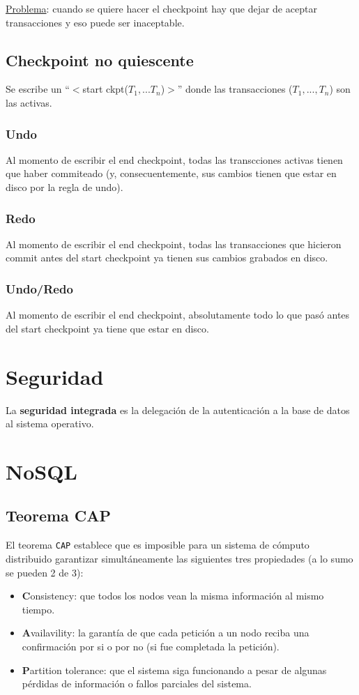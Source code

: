 \documentclass[]{article}
\begin{document}
\underline{Problema}: cuando se quiere hacer el checkpoint hay que dejar de aceptar transacciones y eso puede ser inaceptable.

\subsection{Checkpoint no quiescente}
Se escribe un ``$<$start ckpt($T_1, ... T_n$)$>$'' donde las transacciones ($T_1, ..., T_n$) son las activas.

\subsubsection{Undo}
Al momento de escribir el end checkpoint, todas las transcciones activas tienen que haber commiteado (y, consecuentemente, sus cambios tienen que estar en disco por la regla de undo).
\subsubsection{Redo}
Al momento de escribir el end checkpoint, todas las transacciones que hicieron commit antes del start checkpoint ya tienen sus cambios grabados en disco.
\subsubsection{Undo/Redo}
Al momento de escribir el end checkpoint, absolutamente todo lo que pasó antes del start checkpoint ya tiene que estar en disco.




\section{Seguridad}
La \textbf{seguridad integrada} es la delegación de la autenticación a la base de datos al sistema operativo.


\section{NoSQL}
\subsection{Teorema CAP}
El teorema \texttt{CAP} establece que es imposible para un sistema de cómputo distribuido garantizar simultáneamente las siguientes tres propiedades (a lo sumo se pueden 2 de 3):
\begin{itemize}
    \item \textbf{C}onsistency: que todos los nodos vean la misma información al mismo tiempo.
    \item \textbf{A}vailavility: la garantía de que cada petición a un nodo reciba una confirmación por si o por no (si fue completada la petición).
    \item \textbf{P}artition tolerance: que el sistema siga funcionando a pesar de algunas pérdidas de información o fallos parciales del sistema.
\end{itemize}
\end{document}
